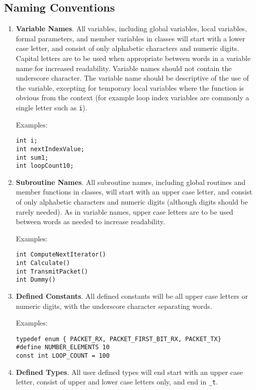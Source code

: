 \documentclass[11pt]{article}
\begin{document}
\subsection{Naming Conventions}
\begin{enumerate}
\item {\bf Variable Names}.  All variables, including global variables,
local variables, formal parameters, 
and member variables in classes will start with a
lower case letter, and consist of only alphabetic characters and numeric
digits.  Capital letters are to be used when appropriate between words
in a variable name for increased readability.  
Variable names should not contain the underscore character.
The variable name should
be descriptive of the use of the variable, excepting for temporary
local variables where the function is obvious from the context (for example
loop index variables are commonly a single letter such as {\tt i}).

Examples:

{\tt int i;}\\
{\tt int nextIndexValue;}\\
{\tt int sum1;}\\
{\tt int loopCount10;}

\item {\bf Subroutine Names}.  All subroutine names, including global
routines and member functions in classes, will start with an upper case
letter, and consist of only alphabetic characters and numeric digits
(although digits should be rarely needed).
As in variable names, upper case letters are to be used between words as needed
to increase readability.

Examples:

{\tt int ComputeNextIterator()}\\
{\tt int Calculate()}\\
{\tt int TransmitPacket()}\\
{\tt int Dummy()}

\item {\bf Defined Constants}.  All defined constants will be all upper
case letters or numeric digits, with the underscore character separating
words.  

Examples:

{\tt typedef enum \{ PACKET\_RX, PACKET\_FIRST\_BIT\_RX, PACKET\_TX\} }\\
{\tt \#define NUMBER\_ELEMENTS 10}\\
{\tt const int LOOP\_COUNT = 100}

\item {\bf Defined Types}.  All user defined types will end start with
an upper case letter, consist of upper and lower case letters only, and
end in {\tt \_t}.


\end{enumerate}
\end{document}
